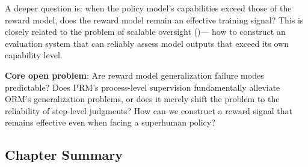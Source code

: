 A deeper question is: when the policy model's capabilities exceed those of the reward model,
does the reward model remain an effective training signal?
This is closely related to the problem of scalable oversight
()---
how to construct an evaluation system that can reliably assess model outputs that exceed its own capability level.

\begin{openproblembox}
\textbf{Core open problem}:
Are reward model generalization failure modes predictable?
Does PRM's process-level supervision fundamentally alleviate ORM's generalization problems,
or does it merely shift the problem to the reliability of step-level judgments?
How can we construct a reward signal that remains effective even when facing a superhuman policy?
\end{openproblembox}

\subsection{Chapter Summary}

